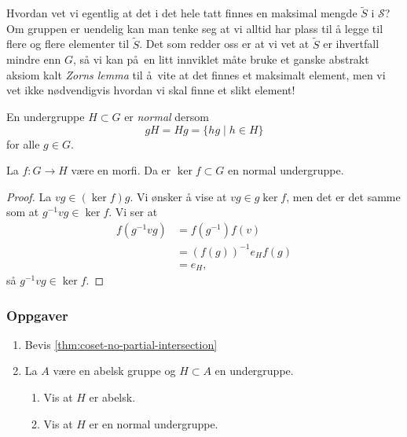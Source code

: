 \begin{remark}
    Hvordan vet vi egentlig at det i det hele tatt finnes en maksimal
    mengde $\tilde S$ i $\mathscr S$?
    Om gruppen er uendelig kan man tenke seg at vi alltid
    har plass til å legge til flere og flere elementer til $\tilde S$.
    Det som redder oss er at vi vet at $\tilde S$ er ihvertfall mindre enn $G$,
    så vi kan på en litt innviklet måte bruke et ganske abstrakt aksiom
    kalt \textit{Zorns lemma} til å vite at det finnes et maksimalt element,
    men vi vet ikke nødvendigvis hvordan vi skal finne et slikt element!
\end{remark}

\begin{definition}
    En undergruppe $H\subset G$ er \textit{normal}
    dersom
    \[
        gH = Hg = \{hg\mid h\in H\}
    \]
    for alle $g\in G$.
\end{definition}

\begin{lemma}
    La $f\colon G\to H$ være en morfi.
    Da er $\ker f\subset G$ en normal undergruppe.
\end{lemma}
\begin{proof}
    La $vg\in(\ker f) g$.
    Vi ønsker å vise at $vg\in g\ker f$,
    men det er det samme som at $g^{-1} vg\in \ker f$.
    Vi ser at
    \[\begin{aligned}
        f(g^{-1}vg)
        &= f(g^{-1})f(v)
        \\
        &= {(f(g))}^{-1} e_H f(g)
        \\
        &= e_H,
    \end{aligned}\]
    så $g^{-1} vg\in \ker f$.
\end{proof}

\subsubsection*{Oppgaver}

\begin{enumerate}
    \item Bevis \cref{thm:coset-no-partial-intersection}
    \item La $A$ være en abelsk gruppe og $H\subset A$ en undergruppe.
        \begin{enumerate}
            \item Vis at $H$ er abelsk.
            \item Vis at $H$ er en normal undergruppe.
        \end{enumerate}
\end{enumerate}

